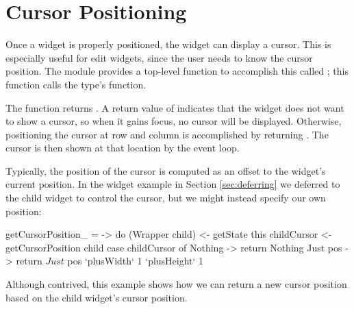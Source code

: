 \section{Cursor Positioning}
\label{sec:cursor_positioning}

Once a widget is properly positioned, the widget can display a cursor.
This is especially useful for edit widgets, since the user needs to
know the cursor position.  The  module provides a top-level
function to accomplish this called ; this
function calls the  type's 
function.

The  function returns .  A return value of  indicates that the
widget does not want to show a cursor, so when it gains focus, no
cursor will be displayed.  Otherwise, positioning the cursor at row
 and column  is accomplished by returning .  The cursor is then shown at that location by
the event loop.

Typically, the position of the cursor is computed as an offset to the
widget's current position.  In the  widget example in
Section \ref{sec:deferring} we deferred to the child widget to control
the cursor, but we might instead specify our own position:

\begin{haskellcode}
 getCursorPosition_ = \this -> do
   (Wrapper child) <- getState this
   childCursor <- getCursorPosition child
   case childCursor of
     Nothing -> return Nothing
     Just pos -> return $ Just $ pos `plusWidth` 1 `plusHeight` 1
\end{haskellcode}

Although contrived, this example shows how we can return a new cursor
position based on the child widget's cursor position.
